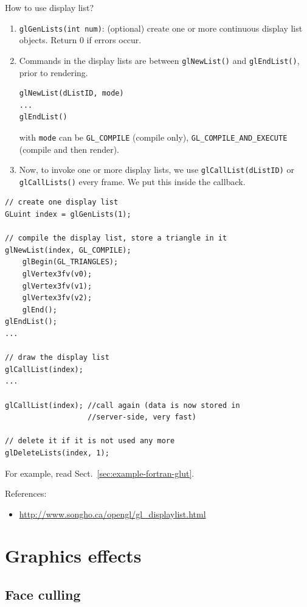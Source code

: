 How to use display list?
\begin{enumerate}
\item \verb!glGenLists(int num)!: (optional) create one or more
  continuous display list objects. Return 0 if errors occur.

\item Commands in the display lists are between \verb!glNewList()! and
  \verb!glEndList()!, prior to rendering. 
\begin{verbatim}
glNewList(dListID, mode)
...
glEndList()
\end{verbatim}
  with \verb!mode! can be \verb!GL_COMPILE! (compile only),
  \verb!GL_COMPILE_AND_EXECUTE! (compile and then render).

\item Now, to invoke one or more display lists, we use
  \verb!glCallList(dListID)! or \verb!glCallLists()! every frame. We
  put this inside the callback.
\end{enumerate}

\begin{verbatim}
// create one display list
GLuint index = glGenLists(1);

// compile the display list, store a triangle in it
glNewList(index, GL_COMPILE);
    glBegin(GL_TRIANGLES);
    glVertex3fv(v0);
    glVertex3fv(v1);
    glVertex3fv(v2);
    glEnd();
glEndList();
...

// draw the display list
glCallList(index);
...

glCallList(index); //call again (data is now stored in 
                   //server-side, very fast)

// delete it if it is not used any more
glDeleteLists(index, 1);
\end{verbatim}

For example, read Sect.~\ref{sec:example-fortran-glut}.

References:
\begin{itemize}
\item \url{http://www.songho.ca/opengl/gl_displaylist.html}
\end{itemize}


\section{Graphics effects}
\label{sec:graphics-effects}

\subsection{Face culling}
\label{sec:face-culling}

